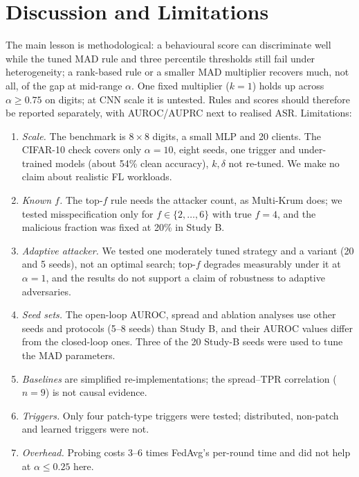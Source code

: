 \section{Discussion and Limitations}
The main lesson is methodological: a behavioural score can discriminate well while the tuned MAD rule and three percentile thresholds still fail under heterogeneity; a rank-based rule or a smaller MAD multiplier recovers much, not all, of the gap at mid-range $\alpha$. One fixed multiplier ($k=1$) holds up across $\alpha\ge0.75$ on digits; at CNN scale it is untested. Rules and scores should therefore be reported separately, with AUROC/AUPRC next to realised ASR. Limitations:
\begin{enumerate}
\item \emph{Scale.} The benchmark is $8{\times}8$ digits, a small MLP and 20 clients. The CIFAR-10 check covers only $\alpha=10$, eight seeds, one trigger and under-trained models (about 54\% clean accuracy), $k,\delta$ not re-tuned. We make no claim about realistic FL workloads.
\item \emph{Known $f$.} The top-$f$ rule needs the attacker count, as Multi-Krum does; we tested misspecification only for $f\in\{2,\dots,6\}$ with true $f=4$, and the malicious fraction was fixed at 20\% in Study B.
\item \emph{Adaptive attacker.} We tested one moderately tuned strategy and a variant (20 and 5 seeds), not an optimal search; top-$f$ degrades measurably under it at $\alpha=1$, and the results do not support a claim of robustness to adaptive adversaries.
\item \emph{Seed sets.} The open-loop AUROC, spread and ablation analyses use other seeds and protocols (5--8 seeds) than Study B, and their AUROC values differ from the closed-loop ones. Three of the 20 Study-B seeds were used to tune the MAD parameters.
\item \emph{Baselines} are simplified re-implementations; the spread--TPR correlation ($n=9$) is not causal evidence.
\item \emph{Triggers.} Only four patch-type triggers were tested; distributed, non-patch and learned triggers were not.
\item \emph{Overhead.} Probing costs 3--6 times FedAvg's per-round time and did not help at $\alpha\le0.25$ here.
\end{enumerate}

